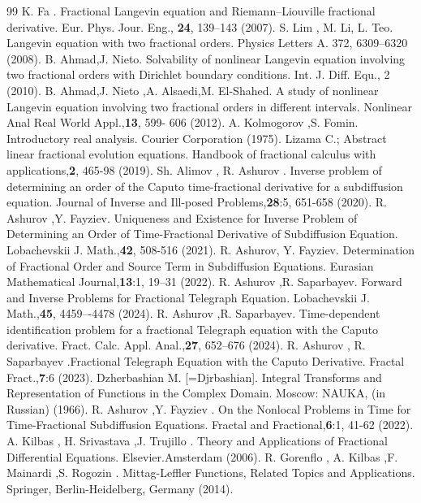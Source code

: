 \documentclass{amsart}
\numberwithin{equation}{section}
\begin{document}
\begin{thebibliography}{99}
 K. Fa . Fractional Langevin equation and Riemann–Liouville fractional derivative. Eur. Phys. Jour. Eng., {\bf 24}, 139–143 (2007).
 S. Lim , M. Li, L. Teo. Langevin equation with two fractional orders. Physics Letters A. 372, 6309–6320 (2008).
 B. Ahmad,J. Nieto. Solvability of nonlinear Langevin equation involving two fractional orders with Dirichlet boundary conditions. Int. J. Diff. Equ., 2 (2010).
 B. Ahmad,J. Nieto ,A. Alsaedi,M. El-Shahed. A study of nonlinear Langevin equation involving two fractional orders in different intervals. Nonlinear Anal Real World Appl.,{\bf 13}, 599- 606 (2012).
A. Kolmogorov ,S. Fomin. Introductory real analysis. Courier Corporation (1975).
 Lizama C.; Abstract linear fractional evolution equations. Handbook of fractional calculus with applications,{\bf 2}, 465-98 (2019).
Sh. Alimov , R. Ashurov . Inverse problem of determining an order of the Caputo time-fractional derivative for a subdiffusion equation. Journal of Inverse and Ill-posed Problems,{\bf 28}:5, 651-658 (2020).
R. Ashurov ,Y. Fayziev. Uniqueness and Existence for Inverse Problem of Determining an Order of Time-Fractional Derivative of Subdiffusion Equation. Lobachevskii J. Math.,{\bf  42}, 508-516 (2021).
R. Ashurov, Y. Fayziev. Determination of Fractional Order and Source Term in Subdiffusion Equations. Eurasian Mathematical Journal,{\bf 13}:1, 19–31 (2022).
R. Ashurov ,R. Saparbayev. Forward and Inverse Problems for Fractional Telegraph Equation. Lobachevskii J. Math.,{\bf 45},  4459–-4478 (2024).
R. Ashurov ,R. Saparbayev. Time-dependent identification problem for a fractional Telegraph equation with the Caputo derivative. Fract. Calc. Appl. Anal.,{\bf 27}, 652–676 (2024).
 R. Ashurov , R. Saparbayev .Fractional Telegraph Equation with the Caputo Derivative. Fractal Fract.,{\bf 7}:6 (2023).
  Dzherbashian M. [=Djrbashian]. Integral Transforms and Representation of Functions in the Complex Domain. Moscow: NAUKA, (in Russian) (1966).
 R. Ashurov ,Y. Fayziev . On the Nonlocal Problems in Time for Time-Fractional Subdiffusion Equations. Fractal and Fractional,{\bf 6}:1, 41-62 (2022).
 A. Kilbas , H. Srivastava ,J. Trujillo . Theory and Applications of Fractional Differential Equations. Elsevier.Amsterdam (2006).
 R. Gorenflo , A. Kilbas ,F. Mainardi ,S. Rogozin . Mittag-Leffler Functions, Related Topics and Applications. Springer, Berlin-Heidelberg, Germany (2014).



\end{thebibliography}
\end{document}
